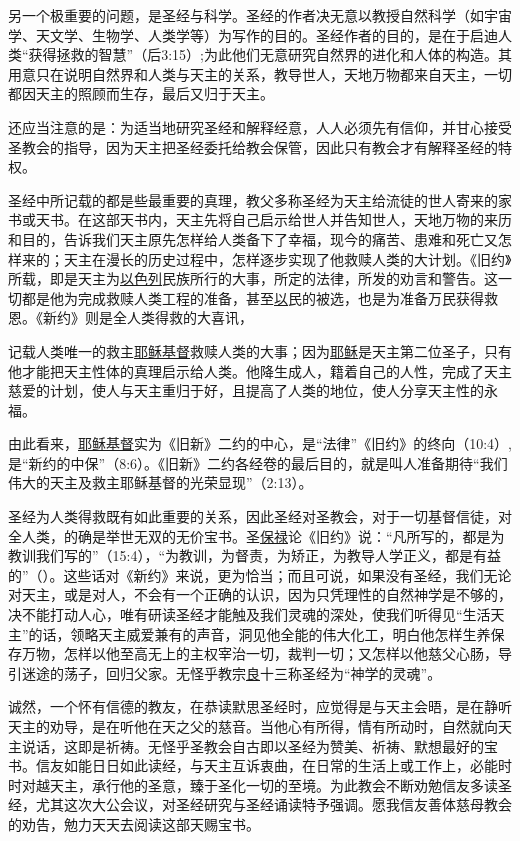 另一个极重要的问题，是圣经与科学。圣经的作者决无意以教授自然科学（如宇宙学、天文学、生物学、人类学等）为写作的目的。圣经作者的目的，是在于启迪人类“获得拯救的智慧”（后3:15）;为此他们无意研究自然界的进化和人体的构造。其用意只在说明自然界和人类与天主的关系，教导世人，天地万物都来自天主，一切都因天主的照顾而生存，最后又归于天主。

还应当注意的是：为适当地研究圣经和解释经意，人人必须先有信仰，并甘心接受圣教会的指导，因为天主把圣经委托给教会保管，因此只有教会才有解释圣经的特权。

圣经中所记载的都是些最重要的真理，教父多称圣经为天主给流徒的世人寄来的家书或天书。在这部天书内，天主先将自己启示给世人并告知世人，天地万物的来历和目的，告诉我们天主原先怎样给人类备下了幸福，现今的痛苦、患难和死亡又怎样来的；天主在漫长的历史过程中，怎样逐步实现了他救赎人类的大计划。《旧约》所载，即是天主为\uline{以色列}民族所行的大事，所定的法律，所发的劝言和警告。这一切都是他为完成救赎人类工程的准备，甚至\uline{以}民的被选，也是为准备万民获得救恩。《新约》则是全人类得救的大喜讯，

记载人类唯一的救主\uline{耶稣}\uline{基督}救赎人类的大事；因为\uline{耶稣}是天主第二位圣子，只有他才能把天主性体的真理启示给人类。他降生成人，籍着自己的人性，完成了天主慈爱的计划，使人与天主重归于好，且提高了人类的地位，使人分享天主性的永福。

由此看来，\uline{耶稣}\uline{基督}实为《旧新》二约的中心，是“法律”《旧约》的终向（10:4）,是“新约的中保”（8:6）。《旧新》二约各经卷的最后目的，就是叫人准备期待“我们伟大的天主及救主耶稣基督的光荣显现”（2:13）。

圣经为人类得救既有如此重要的关系，因此圣经对圣教会，对于一切基督信徒，对全人类，的确是举世无双的无价宝书。圣\uline{保禄}论《旧约》说：“凡所写的，都是为教训我们写的”（15:4），“为教训，为督责，为矫正，为教导人学正义，都是有益的”（）。这些话对《新约》来说，更为恰当；而且可说，如果没有圣经，我们无论对天主，或是对人，不会有一个正确的认识，因为只凭理性的自然神学是不够的，决不能打动人心，唯有研读圣经才能触及我们灵魂的深处，使我们听得见“生活天主”的话，领略天主威爱兼有的声音，洞见他全能的伟大化工，明白他怎样生养保存万物，怎样以他至高无上的主权宰治一切，裁判一切；又怎样以他慈父心肠，导引迷途的荡子，回归父家。无怪乎教宗\uline{良}十三称圣经为“神学的灵魂”。

诚然，一个怀有信德的教友，在恭读默思圣经时，应觉得是与天主会晤，是在静听天主的劝导，是在听他在天之父的慈音。当他心有所得，情有所动时，自然就向天主说话，这即是祈祷。无怪乎圣教会自古即以圣经为赞美、祈祷、默想最好的宝书。信友如能日日如此读经，与天主互诉衷曲，在日常的生活上或工作上，必能时时对越天主，承行他的圣意，臻于圣化一切的至境。为此教会不断劝勉信友多读圣经，尤其这次大公会议，对圣经研究与圣经诵读特予强调。愿我信友善体慈母教会的劝告，勉力天天去阅读这部天赐宝书。